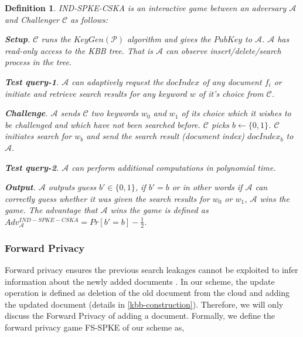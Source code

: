 \documentclass[sigconf,pdftex]{acmart}
\newtheorem{definition}{Definition}[]
\begin{document}
\begin{definition}\label{IND-SPKE-CSKA-game}
 IND-SPKE-CSKA is an interactive game between an adversary $\mathcal{A}$ and Challenger $\mathcal{C}$ as follows:

\textbf{\textit{Setup}}. $\mathcal{C}$ runs the $KeyGen(\mathcal{P})$ algorithm and gives the $PubKey$ to $\mathcal{A}$. $\mathcal{A}$ has read-only access to the KBB tree. That is $\mathcal{A}$ can observe insert/delete/search process in the tree.

\textbf{\textit{Test query-1}}. $\mathcal{A}$ can adaptively request the $docIndex$ of any document $f_i$ or initiate and retrieve search results for any keyword $w$ of it's choice from $\mathcal{C}$.

\textbf{\textit{Challenge}}. $\mathcal{A}$ sends $\mathcal{C}$ two keywords $w_0$ and $w_1$ of its choice which it wishes to be challenged and which have not been searched before. $\mathcal{C}$ picks $b\leftarrow\{0,1\}$. $\mathcal{C}$ initiates search for $w_b$ and send the search result (document index) $docIndex_b$ to $\mathcal{A}$.

\textbf{\textit{Test query-2}}. $\mathcal{A}$ can perform additional computations in polynomial time.  

\textbf{\textit{Output}}. $\mathcal{A}$ outputs guess $b'\in \{0,1\}$, if $b' = b$ or in other words if $\mathcal{A}$ can correctly guess whether it was given the search results for $w_0$ or $w_1$, $\mathcal{A}$ wins the game. The advantage that $\mathcal{A}$ wins the game is defined as $Adv_{\mathcal{A}}^{IND-SPKE-CSKA}= Pr[b' = b]-\frac{1}{2}$.

\end{definition}



\subsubsection{Forward Privacy}\label{theorem4}   

Forward privacy ensures the previous search leakages cannot be exploited to infer information about the newly added documents \cite{stefanov2014practical}. In our scheme, the update operation is defined as deletion of the old document from the cloud and adding the updated document (details in \ref{kbb-construction}). Therefore, we will only discuss the Forward Privacy of adding a document. Formally, we define the forward privacy game FS-SPKE of our scheme as,
\end{document}
